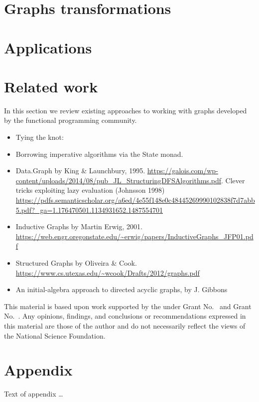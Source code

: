 \documentclass[acmlarge,anonymous]{acmart}\settopmatter{printfolios=true}
\begin{document}
\section{Graphs transformations\label{sec-transformations}}

\section{Applications\label{sec-applications}}

\section{Related work\label{sec-related}}

In this section we review existing approaches to working with graphs developed
by the functional programming community.

\begin{itemize}
    \item Tying the knot:
    \item Borrowing imperative algorithms via the State monad.
    \item Data.Graph by King & Launchbury, 1995. \url{https://galois.com/wp-content/uploads/2014/08/pub_JL_StructuringDFSAlgorithms.pdf}.
    Clever tricks exploiting lazy evaluation (Johnsson 1998) \url{https://pdfs.semanticscholar.org/a6ed/4e55f148e0c48445269990102838f7d7abb5.pdf?_ga=1.176470501.1134931652.1487554701}

    \item Inductive Graphs by Martin Erwig, 2001. \url{https://web.engr.oregonstate.edu/~erwig/papers/InductiveGraphs_JFP01.pdf}
    \item Structured Graphs by Oliveira & Cook. \url{https://www.cs.utexas.edu/~wcook/Drafts/2012/graphs.pdf}
    \item An initial-algebra approach to directed acyclic graphs, by J. Gibbons
\end{itemize}


\begin{acks}                            %
  This material is based upon work supported by the
   under Grant
  No.~ and Grant
  No.~.  Any opinions, findings, and
  conclusions or recommendations expressed in this material are those
  of the author and do not necessarily reflect the views of the
  National Science Foundation.
\end{acks}



\appendix
\section{Appendix}

Text of appendix \ldots
\end{document}
